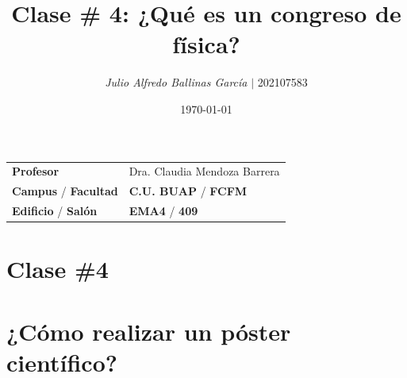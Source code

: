 \documentclass{article}
\title{ \textcolor{Tarawera}{\textbf{Clase \# 4}}: \textcolor{Cinnabar}{\textbf{¿Qué es un congreso de física?}}}
\author{\emph{Julio Alfredo Ballinas García} $\boldsymbol{\mid}$ 202107583}
\date{\today}
\begin{document}
\maketitle



\begin{mybox}
	\noindent\begin{tabular}{@{}ll}
		{\bfseries{Profesor}} & Dra. Claudia Mendoza Barrera\\
		\textcolor{prussianblue}{\bfseries{Campus}} / \textcolor{trueblue}{\bfseries{Facultad}}  & \textcolor{prussianblue}{\bfseries{C.U. BUAP}} /  \textcolor{trueblue}{\bfseries{FCFM}} \\
		\textcolor{prussianblue}{\bfseries{Edificio}} /  \textcolor{trueblue}{\bfseries{Salón}}    & 	\textcolor{prussianblue}{\bfseries{EMA4}} /  \textcolor{trueblue}{\bfseries{409}}   
	\end{tabular} 
\end{mybox} \vspace{1cm}


	



\tableofcontents \vspace{0.5cm}


\section{Clase \#4} \vspace{0.5cm}

\section{¿Cómo realizar un póster científico?} \vspace{0.5cm}
\end{document}

